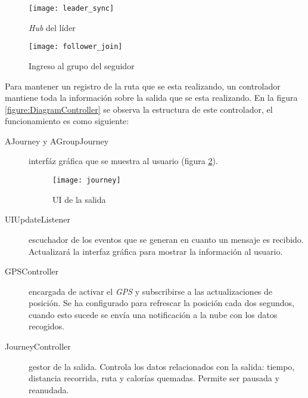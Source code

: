 \begin{figure}[H]
	\begin{minipage}{.5\textwidth}
		\begin{center}
			\texttt{[image: leader\_sync]}
			\caption{\emph{Hub} del líder}
			\label{figure:Hub}
		\end{center}
	\end{minipage}
\begin{minipage}{.5\textwidth}
	\begin{center}
		\texttt{[image: follower\_join]}
		\caption{Ingreso al grupo del seguidor}
		\label{figure:FollowerJoin}
	\end{center}
\end{minipage}
\end{figure}

Para mantener un registro de la ruta que se esta realizando, un controlador mantiene
toda la información sobre la salida que se esta realizando. En la figura
\ref{figure:DiagramController} se observa la estructura de este controlador, el
funcionamiento es como siguiente:
\begin{description}
	\item[AJourney y AGroupJourney] interfáz gráfica que se muestra al usuario
	(figura \ref{figure:Journey}).

	\begin{figure}[H]
		\begin{center}
			\texttt{[image: journey]}
			\caption{UI de la salida}
			\label{figure:Journey}
		\end{center}
	\end{figure}

	\item[UIUpdateListener] escuchador de los eventos que se generan en cuanto un
	mensaje es recibido. Actualizará la interfaz gráfica para mostrar la información
	al usuario.

	\item[GPSController] encargada de activar el \emph{GPS} y subscribirse a las
	actualizaciones de posición. Se ha configurado para refrescar la posición cada
	dos segundos, cuando esto sucede se envía una notificación a la nube con los
	datos recogidos.

	\item[JourneyController] gestor de la salida. Controla los datos relacionados
	con la salida: tiempo, distancia recorrida, ruta y calorías quemadas. Permite
	ser pausada y reanudada.
\end{description}

